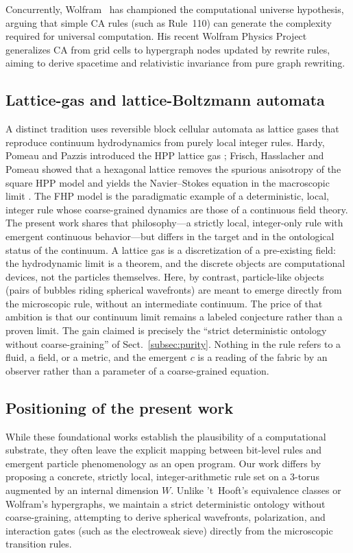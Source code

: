 \documentclass[a4paper]{article}
\begin{document}
Concurrently, Wolfram~\cite{wolfram,wolfram2020physics} has championed the computational universe hypothesis, arguing that simple CA rules (such as Rule~110) can generate the complexity required for universal computation. His recent Wolfram Physics Project generalizes CA from grid cells to hypergraph nodes updated by rewrite rules, aiming to derive spacetime and relativistic invariance from pure graph rewriting. 

\subsection*{Lattice-gas and lattice-Boltzmann automata}
A distinct tradition uses reversible block cellular automata as lattice gases that reproduce continuum hydrodynamics from purely local integer rules.  Hardy, Pomeau and Pazzis introduced the HPP lattice gas \cite{hardy1976}; Frisch, Hasslacher and Pomeau showed that a hexagonal lattice removes the spurious anisotropy of the square HPP model and yields the Navier--Stokes equation in the macroscopic limit \cite{frisch1986}.  The FHP model is the paradigmatic example of a deterministic, local, integer rule whose coarse-grained dynamics are those of a continuous field theory.  The present work shares that philosophy---a strictly local, integer-only rule with emergent continuous behavior---but differs in the target and in the ontological status of the continuum.  A lattice gas is a discretization of a pre-existing field: the hydrodynamic limit is a theorem, and the discrete objects are computational devices, not the particles themselves.  Here, by contrast, particle-like objects (pairs of bubbles riding spherical wavefronts) are meant to emerge directly from the microscopic rule, without an intermediate continuum.  The price of that ambition is that our continuum limit remains a labeled conjecture rather than a proven limit.  The gain claimed is precisely the ``strict deterministic ontology without coarse-graining'' of Sect.~\ref{subsec:purity}.  Nothing in the rule refers to a fluid, a field, or a metric, and the emergent $c$ is a reading of the fabric by an observer rather than a parameter of a coarse-grained equation.

\subsection*{Positioning of the present work}
While these foundational works establish the plausibility of a computational substrate, they often leave the explicit mapping between bit-level rules and emergent particle phenomenology as an open program. Our work differs by proposing a concrete, strictly local, integer-arithmetic rule set on a 3-torus augmented by an internal dimension $W$. Unlike 't~Hooft's equivalence classes or Wolfram's hypergraphs, we maintain a strict deterministic ontology without coarse-graining, attempting to derive spherical wavefronts, polarization, and interaction gates (such as the electroweak sieve) directly from the microscopic transition rules.
\end{document}
